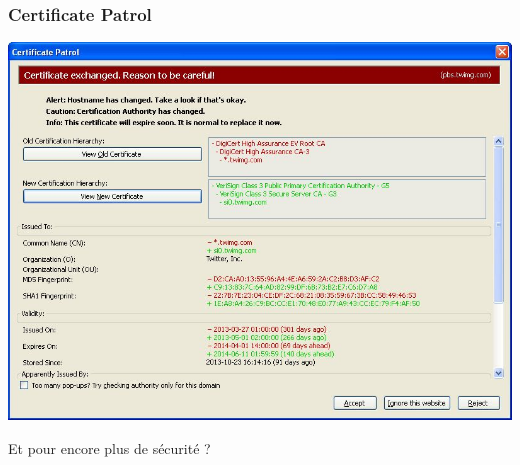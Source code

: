 \documentclass{beamer}
\begin{document}
\begin{frame}
\frametitle{Certificate Patrol}
\begin{center}
\includegraphics[scale=0.5] {./images/Certificate_Patrol_certifcat_a_change.jpg}
\end{center}
\end{frame}


\begin{frame}
\begin{center}
\Huge{Et pour encore plus de sécurité ?}
\end{center}
\end{frame}
\end{document}
